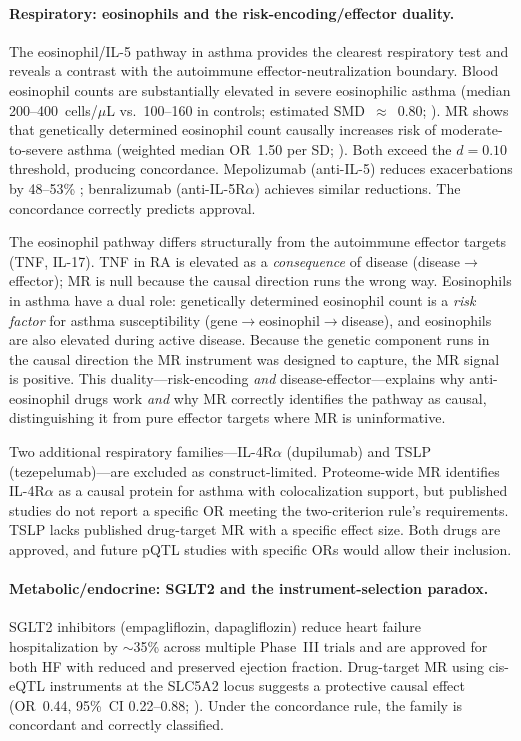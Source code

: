 \documentclass[11pt]{article}
\begin{document}
\paragraph{Respiratory: eosinophils and the risk-encoding/effector duality.}
The eosinophil/IL-5 pathway in asthma provides the clearest respiratory test and reveals a contrast with the autoimmune effector-neutralization boundary. Blood eosinophil counts are substantially elevated in severe eosinophilic asthma (median 200--400~cells/$\mu$L vs.\ 100--160 in controls; estimated SMD~$\approx$~0.80; \cite{wagener2022eosinophils}). MR shows that genetically determined eosinophil count causally increases risk of moderate-to-severe asthma (weighted median OR~1.50 per SD; \cite{han2020eosinophilasthma}). Both exceed the $d = 0.10$ threshold, producing concordance. Mepolizumab (anti-IL-5) reduces exacerbations by 48--53\% \cite{pavord2012dream}; benralizumab (anti-IL-5R$\alpha$) achieves similar reductions. The concordance correctly predicts approval.

The eosinophil pathway differs structurally from the autoimmune effector targets (TNF, IL-17). TNF in RA is elevated as a \emph{consequence} of disease (disease$\to$effector); MR is null because the causal direction runs the wrong way. Eosinophils in asthma have a dual role: genetically determined eosinophil count is a \emph{risk factor} for asthma susceptibility (gene$\to$eosinophil$\to$disease), and eosinophils are also elevated during active disease. Because the genetic component runs in the causal direction the MR instrument was designed to capture, the MR signal is positive. This duality---risk-encoding \emph{and} disease-effector---explains why anti-eosinophil drugs work \emph{and} why MR correctly identifies the pathway as causal, distinguishing it from pure effector targets where MR is uninformative.

Two additional respiratory families---IL-4R$\alpha$ (dupilumab) and TSLP (tezepelumab)---are excluded as construct-limited. Proteome-wide MR identifies IL-4R$\alpha$ as a causal protein for asthma with colocalization support, but published studies do not report a specific OR meeting the two-criterion rule's requirements. TSLP lacks published drug-target MR with a specific effect size. Both drugs are approved, and future pQTL studies with specific ORs would allow their inclusion.

\paragraph{Metabolic/endocrine: SGLT2 and the instrument-selection paradox.}
SGLT2 inhibitors (empagliflozin, dapagliflozin) reduce heart failure hospitalization by $\sim$35\% across multiple Phase~III trials and are approved for both HF with reduced and preserved ejection fraction. Drug-target MR using cis-eQTL instruments at the SLC5A2 locus suggests a protective causal effect (OR~0.44, 95\%~CI 0.22--0.88; \cite{zheng2020sglt2mr}). Under the concordance rule, the family is concordant and correctly classified.
\end{document}
